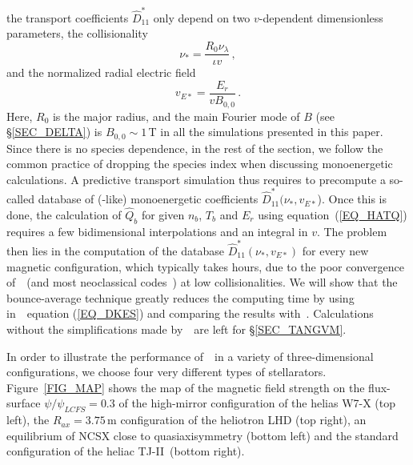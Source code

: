 the transport coefficients $\hat D_{11}^*$ only depend on two $v$-dependent dimensionless parameters, the collisionality 
\begin{equation}
\nu_{*}=\frac{R_0\nu_\lambda}{\iota v}\,,
\end{equation}
and the normalized radial electric field
\begin{equation}
v_{E*}=\frac{E_r}{v B_{0,0}}\,.
\end{equation}
Here, $R_0$ is the major radius, and the main Fourier mode of $B$ (see \S\ref{SEC_DELTA}) is $B_{0,0}\sim 1\,$T in all the simulations presented in this paper. Since there is no species dependence, in the rest of the section, we follow the common practice of dropping the species index when discussing monoenergetic calculations. A predictive transport simulation thus requires to precompute a so-called database of (\DKES-like) monoenergetic coefficients $\hat D_{11}^*( \nu_*,v_{E*}$). Once this is done, the calculation of $\hat Q_b$ for given $n_b$, $T_b$ and $E_r$ using equation~(\ref{EQ_HATQ}) requires a few bidimensional interpolations and an integral in $v$. The problem then lies in the computation of the database $\hat D_{11}^*( \nu_*,v_{E*})$ for every new magnetic configuration, which typically takes hours, due to the poor convergence of~\DKES~(and most neoclassical codes~\citep{beidler2011icnts}) at low collisionalities. We will show that the bounce-average technique greatly reduces the computing time by using in~\KNOSOS~equation (\ref{EQ_DKES}) and comparing the results with~\DKES. Calculations without the simplifications made by~\DKES~are left for \S\ref{SEC_TANGVM}.

In order to illustrate the performance of~\KNOSOS~in a variety of three-dimensional configurations, we choose four very different types of stellarators. Figure~\ref{FIG_MAP} shows the map of the magnetic field strength on the flux-surface  $\psi/\psi_{LCFS}=0.3$ of the high-mirror configuration of the helias W7-X (top left), the $R_{ax}=3.75\,$m configuration of the heliotron LHD (top right), an equilibrium of NCSX close to  quasiaxisymmetry (bottom left) and the standard configuration of the heliac TJ-II~(bottom right)\citep{ascasibar2019iaea}. 

